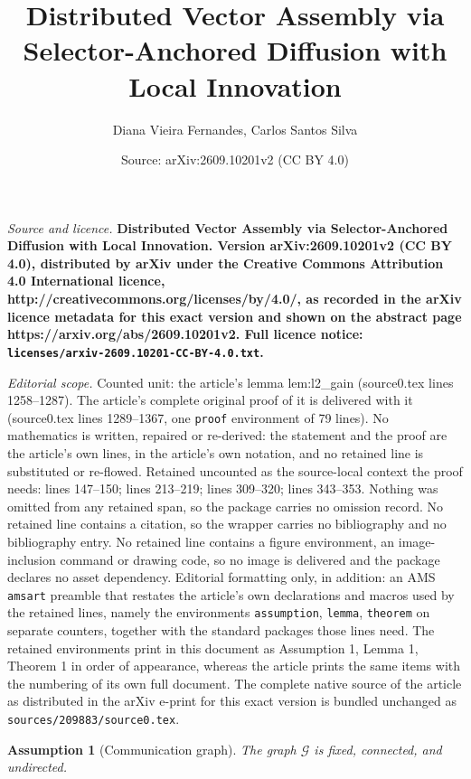 \documentclass[10pt,a4paper]{amsart}
\title{\LARGE \bf Distributed Vector Assembly via Selector-Anchored Diffusion with Local Innovation}
\author{Diana Vieira Fernandes, Carlos Santos Silva}
\date{Source: arXiv:2609.10201v2 (CC BY 4.0)}
\newtheorem{assumption}{Assumption}
\begin{document}
\maketitle

\noindent\emph{Source and licence.} \LARGE \bf Distributed Vector Assembly via Selector-Anchored Diffusion with Local Innovation. Version arXiv:2609.10201v2 (CC BY 4.0), distributed by arXiv under the Creative Commons Attribution 4.0 International licence, http://creativecommons.org/licenses/by/4.0/, as recorded in the arXiv licence metadata for this exact version and shown on the abstract page https://arxiv.org/abs/2609.10201v2. Full licence notice: \texttt{licenses/arxiv-2609.10201-CC-BY-4.0.txt}.\par\smallskip

\noindent\textit{Editorial scope.} Counted unit: the article's lemma lem:l2\_gain (source0.tex lines 1258--1287). The article's complete original proof of it is delivered with it (source0.tex lines 1289--1367, one \texttt{proof} environment of 79 lines). No mathematics is written, repaired or re-derived: the statement and the proof are the article's own lines, in the article's own notation, and no retained line is substituted or re-flowed.  Retained uncounted as the source-local context the proof needs: lines 147--150; lines 213--219; lines 309--320; lines 343--353.  Nothing was omitted from any retained span, so the package carries no omission record.  No retained line contains a citation, so the wrapper carries no bibliography and no bibliography entry.  No retained line contains a figure environment, an image-inclusion command or drawing code, so no image is delivered and the package declares no asset dependency.  Editorial formatting only, in addition: an AMS \texttt{amsart} preamble that restates the article's own declarations and macros used by the retained lines, namely the environments \texttt{assumption}, \texttt{lemma}, \texttt{theorem} on separate counters, together with the standard packages those lines need.  The retained environments print in this document as Assumption 1, Lemma 1, Theorem 1 in order of appearance, whereas the article prints the same items with the numbering of its own full document.  The complete native source of the article as distributed in the arXiv e-print for this exact version is bundled unchanged as \texttt{sources/209883/source0.tex}.
\begin{assumption}[Communication graph]
\label{ass:graph}
The graph \(\mathcal G\) is fixed, connected, and undirected.
\end{assumption}
\end{document}
